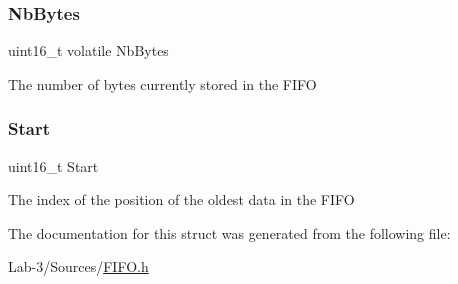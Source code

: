 \subsubsection{\texorpdfstring{Nb\+Bytes}{NbBytes}}
{\footnotesize\ttfamily uint16\+\_\+t volatile Nb\+Bytes}

The number of bytes currently stored in the F\+I\+FO \mbox{\label{struct_t_f_i_f_o_a4f967ca491e9a73c29bc50bc9ff53b68}} 
\subsubsection{\texorpdfstring{Start}{Start}}
{\footnotesize\ttfamily uint16\+\_\+t Start}

The index of the position of the oldest data in the F\+I\+FO 

The documentation for this struct was generated from the following file\+:\begin{DoxyCompactItemize}
\item 
Lab-\/3/\+Sources/\hyperlink{_f_i_f_o_8h}{F\+I\+F\+O.\+h}\end{DoxyCompactItemize}
